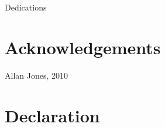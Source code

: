 
\newpage \vspace*{8cm} 
\begin{center}
	\large Dedications
\end{center}
\newpage

\chapter*{Acknowledgements}
\vspace{-0.5cm}

\vspace*{4cm}
Allan Jones, 2010

\chapter*{Declaration}
\vspace{-0.5cm}

\singlespacing

\tableofcontents \listoffigures \listoftables 
\newpage
